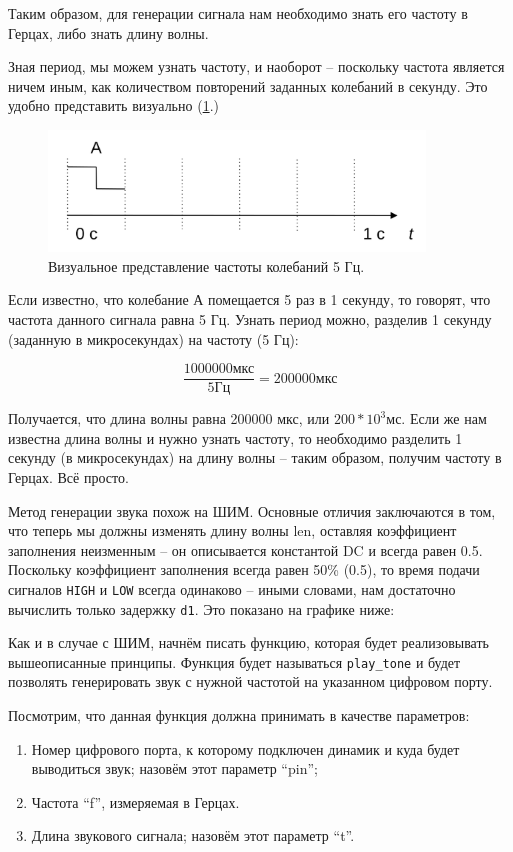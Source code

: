 \documentclass[a4paper,twoside]{book}
\begin{document}
Таким образом, для генерации сигнала нам необходимо знать его частоту в Герцах,
либо знать длину волны.

Зная период, мы можем узнать частоту, и наоборот -- поскольку частота является
ничем иным, как количеством повторений заданных колебаний в секунду. Это удобно
представить визуально (\ref{fig:sound-fig-1}.)

\begin{figure}[h]
  \caption{Визуальное представление частоты колебаний 5 Гц.}
  \label{fig:sound-fig-1}
  \includegraphics[width=10cm]{sound-fig-1}
  \centering
\end{figure}

Если известно, что колебание А помещается 5 раз в 1 секунду, то говорят, что
частота данного сигнала равна 5 Гц. Узнать период можно, разделив 1 секунду
(заданную в микросекундах) на частоту (5 Гц):

\begin{equation}
  \frac{1000000 \mbox{мкс}}{5 \mbox{Гц}} = 200000 \mbox{мкс}
\end{equation}

Получается, что длина волны равна 200000 мкс, или $ 200 * 10^3 \mbox{мс} $. Если
же нам известна длина волны и нужно узнать частоту, то необходимо разделить 1
секунду (в микросекундах) на длину волны -- таким образом, получим частоту в
Герцах. Всё просто.

Метод генерации звука похож на ШИМ. Основные отличия заключаются в том, что
теперь мы должны изменять длину волны len, оставляя коэффициент заполнения
неизменным -- он описывается константой DC и всегда равен 0.5. Поскольку
коэффициент заполнения всегда равен 50\% (0.5), то время подачи сигналов
\texttt{HIGH} и \texttt{LOW} всегда одинаково -- иными словами, нам достаточно
вычислить только задержку \texttt{d1}. Это показано на графике ниже:

Как и в случае с ШИМ, начнём писать функцию, которая будет реализовывать
вышеописанные принципы. Функция будет называться \texttt{play\_tone} и будет
позволять генерировать звук с нужной частотой на указанном цифровом порту.

Посмотрим, что данная функция должна принимать в качестве параметров:
\begin{enumerate}
\item Номер цифрового порта, к которому подключен динамик и куда будет
  выводиться звук; назовём этот параметр ``pin'';
\item Частота ``f'', измеряемая в Герцах. 
\item Длина звукового сигнала; назовём этот параметр ``t''.
\end{enumerate}
\end{document}
